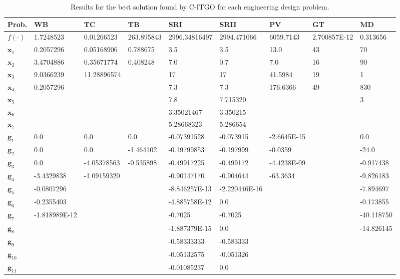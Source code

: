 
\noindent
\begin{table*}[h]
    \tiny
\begin{center}
\begin{tabular}{ | P{1.0cm} | P{1.2cm} |  P{1.2cm} | P{1.2cm} | P{1.2cm} | P{1.2cm} | P{1.2cm} | P{1.2cm} | P{1.2cm} |  }
\hline
\textbf{Prob.} & \textbf{WB} & \textbf{TC} & \textbf{TB} & \textbf{SRI} & \textbf{SRII} & \textbf{PV} & \textbf{GT} & \textbf{MD} \\
\hline
\rule{0pt}{3ex}
$f(\cdot)$ & 1.7248523 & 0.01266523 & 263.895843 & 2996.34816497 & 2994.471066 & 6059.7143 & 2.700857E-12 & 0.313656 \\
\hline
\rule{0pt}{3ex}
$\bm{x}_1$ &  0.2057296 & 0.05168906 & 0.788675 & 3.5 & 3.5 & 13.0 & 43 & 70  \\
$\bm{x}_2$ &  3.4704886 & 0.35671774 & 0.408248 & 7.0 & 0.7 & 7.0 & 16 & 90 \\
$\bm{x}_3$ &  9.0366239 & 11.28896574 & & 17 & 17 & 41.5984 & 19 &  1  \\
$\bm{x}_4$ &  0.2057296 & & & 7.3 & 7.3 & 176.6366 & 49 & 830  \\
$\bm{x}_5$ & & & & 7.8 & 7.715320 & & & 3 \\
$\bm{x}_6$ & & & & 3.35021467 & 3.350215 & & &   \\
$\bm{x}_7$ & & & & 5.28668323 & 5.286654 & & &   \\
\hline
\rule{0pt}{3ex}
$\bm{g}_1$ & 0.0 & 0.0 & 0.0 & -0.07391528 & -0.073915 & -2.6645E-15 & & 0.0  \\
$\bm{g}_2$ & 0.0 & 0.0 & -1.464102 & -0.19799853 & -0.197999 & -0.0359 & & -24.0  \\
$\bm{g}_3$ & 0.0 & -4.05378563 & -0.535898 & -0.49917225 & -0.499172 & -4.4238E-09 & & -0.917438 \\
$\bm{g}_4$ & -3.4329838 & -1.09159320 & & -0.90147170 & -0.904644 & -63.3634 & & -9.826183  \\
$\bm{g}_5$ & -0.0807296 & & & -8.846257E-13 & -2.220446E-16 & & &  -7.894697 \\
$\bm{g}_6$ & -0.2355403 & & & -4.885758E-12 & 0.0 & & & -0.173855  \\
$\bm{g}_7$ & -1.818989E-12 & & & -0.7025 & -0.7025 & & & -40.118750 \\
$\bm{g}_8$ & & & & -1.887379E-15 & 0.0 & & &  -14.826145 \\
$\bm{g}_9$ & & & & -0.58333333 & -0.583333 & & &    \\
$\bm{g}_{10}$ & & & & -0.05132575 & -0.051326 & & &    \\
$\bm{g}_{11}$ & & & & -0.01085237 & 0.0 & & &    \\
\hline
\end{tabular}
\end{center}
\vspace*{-6mm}
\caption{Results for the best solution found by C-ITGO for each engineering design problem. \\[1em]}
\label{tab:BestResults}
\end{table*}


